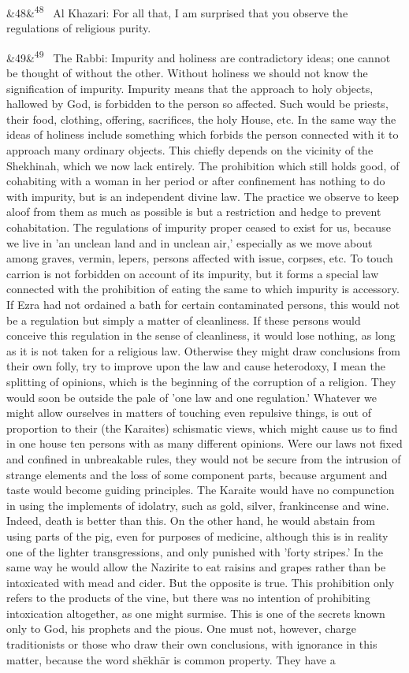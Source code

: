 \documentclass[12pt]{article}
\newcommand{\para}[1][]{\par\noindent\ifx&#1&\else\textsuperscript{\footnotesize #1}~\fi}
\begin{document}
\para[48] Al Khazari: For all that, I am surprised that you observe the regulations of religious purity.

\para[49] The Rabbi: Impurity and holiness are contradictory ideas; one cannot be thought of without the other. Without holiness we should not know the signification of impurity. Impurity means that the approach to holy objects, hallowed by God, is forbidden to the person so affected. Such would be priests, their food, clothing, offering, sacrifices, the holy House, etc. In the same way the ideas of holiness include something which forbids the person connected with it to approach many ordinary objects. This chiefly depends on the vicinity of the Shekhinah, which we now lack entirely. The prohibition which still holds good, of cohabiting with a woman in her period or after confinement has nothing to do with impurity, but is an independent divine law. The practice we observe to keep aloof from them as much as possible is but a restriction and hedge to prevent cohabitation. The regulations of impurity proper ceased to exist for us, because we live in 'an unclean land and in unclean air,' especially as we move about among graves, vermin, lepers, persons affected with issue, corpses, etc. To touch carrion is not forbidden on account of its impurity, but it forms a special law connected with the prohibition of eating the same to which impurity is accessory. If Ezra had not ordained a bath for certain contaminated persons, this would not be a regulation but simply a matter of cleanliness. If these persons would conceive this regulation in the sense of cleanliness, it would lose nothing, as long as it is not taken for a religious law. Otherwise they might draw conclusions from their own folly, try to improve upon the law and cause heterodoxy, I mean the splitting of opinions, which is the beginning of the corruption of a religion. They would soon be outside the pale of 'one law and one regulation.' Whatever we might allow ourselves in matters of touching even repulsive things, is out of proportion to their (the Karaites) schismatic views, which might cause us to find in one house ten persons with as many different opinions. Were our laws not fixed and confined in unbreakable rules, they would not be secure from the intrusion of strange elements and the loss of some component parts, because argument and taste would become guiding principles. The Karaite would have no compunction in using the implements of idolatry, such as gold, silver, frankincense and wine. Indeed, death is better than this. On the other hand, he would abstain from using parts of the pig, even for purposes of medicine, although this is in reality one of the lighter transgressions, and only punished with 'forty stripes.' In the same way he would allow the Nazirite to eat raisins and grapes rather than be intoxicated with mead and cider. But the opposite is true. This prohibition only refers to the products of the vine, but there was no intention of prohibiting intoxication altogether, as one might surmise. This is one of the secrets known only to God, his prophets and the pious. One must not, however, charge traditionists or those who draw their own conclusions, with ignorance in this matter, because the word shēkhār is common property. They have a 
\end{document}

